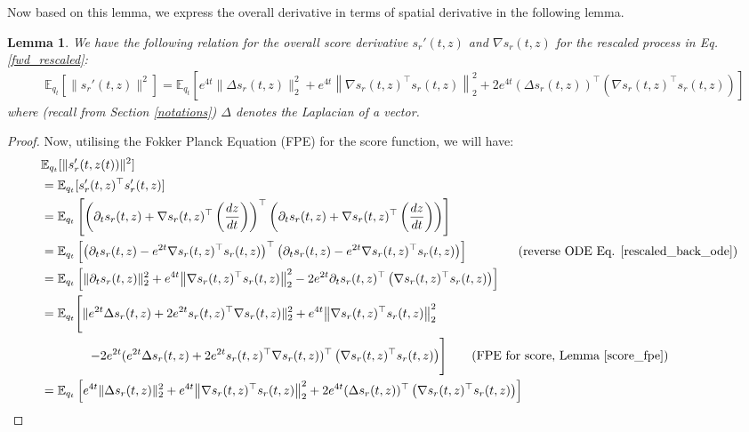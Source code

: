 \documentclass{article}
\newtheorem{lemma}{Lemma}[section]
\begin{document}
\noindent
Now  based on this lemma, we express  the overall derivative in terms of spatial derivative in the following lemma. 
\begin{lemma}
\label{overall_to_spatial}
    We have the following relation for the overall score derivative  $s_r'(t,z)$ and $\nabla s_r(t,z)$ for the rescaled process in Eq. \ref{fwd_rescaled}:
    \begin{align}
    \label{eq_overall_to_spatial}
        &\mathbb{E}_{q_t}[\|s_r'(t,z)\|^2] = {\mathbb{E}_{q_t}\left[{ e^{4t}\| \Delta s_r(t,z) \|^2_2} + e^{4t}{\left\|\nabla s_r(t,z)^\top s_r(t,z)\right\|_2^2} + 2e^{4t}(\Delta s_r(t,z))^\top\left(\nabla s_r(t,z)^\top s_r(t,z)\right)\right]}
    \end{align}
    where (recall from Section \ref{notations}) $\Delta$ denotes the Laplacian of a vector.
\end{lemma}
\begin{proof}
    Now, utilising the Fokker Planck Equation (FPE) for the score function, we will have:
    \begin{align*}
        &\mathbb{E}_{q_t}[\|s_r'(t,z(t))\|^2] \\
        &= \mathbb{E}_{q_t}[s_r'(t,z)^\top s_r'(t,z)] \\ 
    &= \mathbb{E}_{q_t}\left[\left(\partial_t s_r(t,z) + \nabla s_r(t,z)^\top\left(\frac{d z}{dt}\right)\right)^\top\left(\partial_t s_r(t,z) + \nabla s_r(t,z)^\top\left(\frac{d z}{dt}\right)\right)\right] \\
    &= \mathbb{E}_{q_t}\left[\left(\partial_t s_r(t,z) - e^{2t}\nabla s_r(t,z)^\top s_r(t,z)\right)^\top\left(\partial_t s_r(t,z) - e^{2t}\nabla s_r(t,z)^\top s_r(t,z)\right)\right] \qquad \tag{reverse ODE Eq. \ref{rescaled_back_ode}}\\
     &= {\mathbb{E}_{q_t}\left[{ \|\partial_t s_r(t,z)\|^2_2} + e^{4t}{\left\|\nabla s_r(t,z)^\top s_r(t,z)\right\|_2^2} - 2e^{2t}{\partial_t s_r(t,z)^\top \left(\nabla s_r(t,z)^\top s_r(t,z)\right)}\right]} \\
     &= {\mathbb{E}_{q_t}\Bigg[{ \|e^{2t} \Delta s_r(t,z) + 2e^{2t}s_r(t,z)^\top\nabla s_r(t,z)\|^2_2} + e^{4t}{\left\|\nabla s_r(t,z)^\top s_r(t,z)\right\|_2^2}} \\
     &\qquad \qquad {-2e^{2t}{(e^{2t} \Delta s_r(t,z) + 2e^{2t}s_r(t,z)^\top\nabla s_r(t,z))^\top \left(\nabla s_r(t,z)^\top s_r(t,z)\right)}\Bigg] \tag{FPE for score, Lemma \ref{score_fpe}}} \\
        &= {\mathbb{E}_{q_t}\left[{ e^{4t}\| \Delta s_r(t,z) \|^2_2} + e^{4t}{\left\|\nabla s_r(t,z)^\top s_r(t,z)\right\|_2^2} + 2e^{4t}(\Delta s_r(t,z))^\top\left(\nabla s_r(t,z)^\top s_r(t,z)\right)\right]} \\
    \end{align*}
\end{proof}
\end{document}
